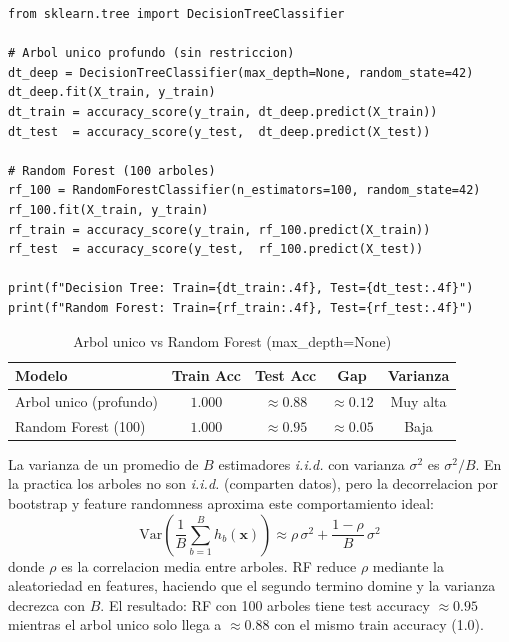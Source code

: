 \documentclass[12pt,a4paper]{article}
\begin{document}
\begin{lstlisting}[caption={Arbol unico vs Random Forest}]
from sklearn.tree import DecisionTreeClassifier

# Arbol unico profundo (sin restriccion)
dt_deep = DecisionTreeClassifier(max_depth=None, random_state=42)
dt_deep.fit(X_train, y_train)
dt_train = accuracy_score(y_train, dt_deep.predict(X_train))
dt_test  = accuracy_score(y_test,  dt_deep.predict(X_test))

# Random Forest (100 arboles)
rf_100 = RandomForestClassifier(n_estimators=100, random_state=42)
rf_100.fit(X_train, y_train)
rf_train = accuracy_score(y_train, rf_100.predict(X_train))
rf_test  = accuracy_score(y_test,  rf_100.predict(X_test))

print(f"Decision Tree: Train={dt_train:.4f}, Test={dt_test:.4f}")
print(f"Random Forest: Train={rf_train:.4f}, Test={rf_test:.4f}")
\end{lstlisting}

\begin{table}[H]
  \centering
  \caption{Arbol unico vs Random Forest (max\_depth=None)}
  \label{tab:dt_vs_rf}
  \begin{tabular}{lcccc}
    \toprule
    \textbf{Modelo} & \textbf{Train Acc} & \textbf{Test Acc} & \textbf{Gap} & \textbf{Varianza} \\
    \midrule
    Arbol unico (profundo) & $1.000$ & $\approx 0.88$ & $\approx 0.12$ & Muy alta \\
    Random Forest (100)   & $1.000$ & $\approx 0.95$ & $\approx 0.05$ & Baja     \\
    \bottomrule
  \end{tabular}
\end{table}

\begin{tcolorbox}[warnbox, title={Por que el ensemble mejora al arbol individual}]
  La varianza de un promedio de $B$ estimadores \textit{i.i.d.} con varianza $\sigma^2$ es
  $\sigma^2/B$. En la practica los arboles no son \textit{i.i.d.} (comparten datos), pero la
  decorrelacion por bootstrap y feature randomness aproxima este comportamiento ideal:
  \begin{equation}
    \text{Var}\!\left(\frac{1}{B}\sum_{b=1}^{B} h_b(\mathbf{x})\right) \approx \rho\,\sigma^2 + \frac{1-\rho}{B}\,\sigma^2
    \label{eq:ensemble_var}
  \end{equation}
  donde $\rho$ es la correlacion media entre arboles. RF reduce $\rho$ mediante la aleatoriedad
  en features, haciendo que el segundo termino domine y la varianza decrezca con $B$.
  El resultado: RF con 100 arboles tiene test accuracy $\approx 0.95$ mientras el arbol unico
  solo llega a $\approx 0.88$ con el mismo train accuracy (1.0).
\end{tcolorbox}
\end{document}
